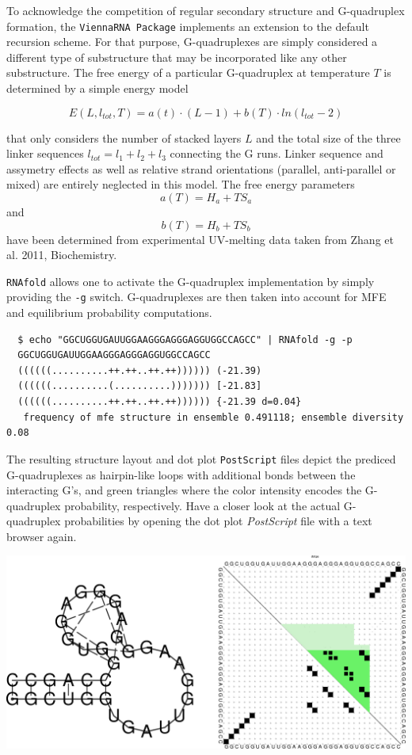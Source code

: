 \documentclass[a4paper]{article}
\begin{document}
To
acknowledge the competition of regular secondary structure and G-quadruplex formation,
the \texttt{ViennaRNA Package} implements an extension to the default recursion scheme.
For that purpose, G-quadruplexes are simply considered a different type of substructure
that may be incorporated like any other substructure. The free energy of a particular
G-quadruplex at temperature $T$ is determined by a simple energy model

$$E(L, l_{tot}, T) = a(t) \cdot (L - 1) + b(T) \cdot ln(l_{tot} - 2)$$

that only considers the number of stacked layers $L$ and the total size of the three
linker sequences $l_{tot} = l_1 + l_2 + l_3$ connecting the G runs. Linker sequence
and assymetry effects as well as relative strand orientations (parallel, anti-parallel
or mixed) are entirely neglected in this model. The free energy parameters
$$a(T) = H_a + TS_a$$ and
$$b(T) = H_b + TS_b$$ have been determined from experimental UV-melting data taken
from Zhang et al. 2011, Biochemistry.

\texttt{RNAfold} allows one to activate the G-quadruplex implementation by simply
providing the \texttt{-g} switch. G-quadruplexes are then taken into account for
MFE and equilibrium probability computations.

\begin{verbatim}
  $ echo "GGCUGGUGAUUGGAAGGGAGGGAGGUGGCCAGCC" | RNAfold -g -p
  GGCUGGUGAUUGGAAGGGAGGGAGGUGGCCAGCC
  ((((((..........++.++..++.++)))))) (-21.39)
  ((((((..........(..........))))))) [-21.83]
  ((((((..........++.++..++.++)))))) {-21.39 d=0.04}
   frequency of mfe structure in ensemble 0.491118; ensemble diversity 0.08
\end{verbatim}

The resulting structure layout and dot plot \texttt{PostScript} files depict the
prediced G-quadruplexes as hairpin-like loops with additional bonds between the
interacting G's, and green triangles where the color intensity encodes the G-quadruplex
probability, respectively. Have a closer look at the actual G-quadruplex probabilities
by opening the dot plot \textit{PostScript} file with a text browser again.

\begin{center}
\includegraphics[width=.75\textwidth]{Figures/gquad_menon.eps}\\
\end{center}
\end{document}
